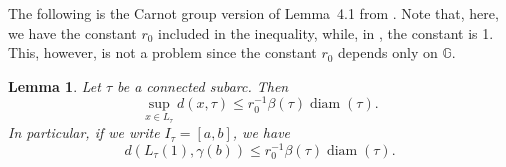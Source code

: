 \documentclass[11pt]{amsart}
\newtheorem{lemma}[theorem]{Lemma}
\def\diam{{\rm diam\,}}
\theoremstyle{definition}
\def\diam{\operatorname{diam}}
\numberwithin{theorem}{section} \numberwithin{equation}{section}
\begin{document}
The following is the Carnot group version of Lemma~4.1 from \cite{LiSchul}.
Note that, here, we have the constant $r_0$ included in the inequality, while, in \cite{LiSchul}, the constant is 1.
This, however, is not a problem since the constant $r_0$ depends only on $\mathbb{G}$.

\begin{lemma}
Let $\tau$ be a connected subarc.
Then
\begin{equation}
\label{arcseg}
\sup_{x \in L_{\tau}} d(x,\tau) \leq r_0^{-1} \beta(\tau) \diam(\tau).
\end{equation}
In particular, if we write $I_\tau = [a,b]$, we have
\begin{equation}
\label{endpt}
d(L_{\tau}(1), \gamma(b)) \leq r_0^{-1} \beta(\tau) \diam(\tau).
\end{equation}
\end{lemma}
\end{document}
